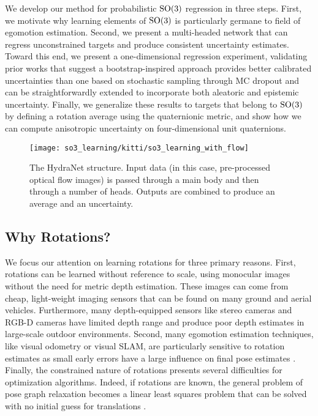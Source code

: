 We develop our method for probabilistic $\mathrm{SO}(3)$ regression in three steps. 
First, we motivate why learning elements of $\mathrm{SO}(3)$ is particularly germane to field of egomotion estimation. Second, we present a multi-headed network that can regress unconstrained targets and produce consistent uncertainty estimates. Toward this end, we present a one-dimensional regression experiment, validating prior works \citep{Lakshminarayanan2017,Osband2016} that suggest a bootstrap-inspired approach provides better calibrated uncertainties than one based on stochastic sampling through MC dropout and can be straightforwardly extended to incorporate both aleatoric and epistemic uncertainty. Finally, we generalize these results to targets that belong to $\mathrm{SO}(3)$ by defining a rotation average using the quaternionic metric, and show how we can compute anisotropic uncertainty on four-dimensional unit quaternions.

\begin{figure}
	\centering
	\texttt{[image: so3\_learning/kitti/so3\_learning\_with\_flow]}
	\caption{The HydraNet structure. Input data (in this case, pre-processed optical flow images) is passed through a main body and then through a number of heads. Outputs are combined to produce an average and an uncertainty.}
	\label{fig:kitti_flow_hydranet}
\end{figure}

\subsection{Why Rotations?}
We focus our attention on learning rotations for three primary reasons. 
First, rotations can be learned without reference to scale, using monocular images without the need for metric depth estimation. These images can come from cheap, light-weight imaging sensors that can be found on many ground and aerial vehicles. Furthermore, many depth-equipped sensors like stereo cameras and RGB-D cameras have limited depth range and produce poor depth estimates in large-scale outdoor environments.  Second, many egomotion estimation techniques, like visual odometry or visual SLAM, are particularly sensitive to rotation estimates as small early errors have a large influence on final pose estimates \citep{Olson2003-ax}. Finally, the constrained nature of rotations presents several difficulties for optimization algorithms. Indeed, if rotations are known, the general problem of pose graph relaxation becomes a linear least squares problem that can be solved with no initial guess for translations \citep{Carlone2015-ud}. 

